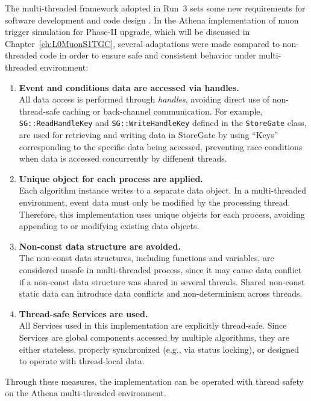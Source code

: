 The multi-threaded framework adopted in Run~3 sets some new requirements for software development and code design \cite{ATLAScomputing2025}. In the Athena implementation of muon trigger simulation for Phase-II upgrade, which will be discussed in Chapter~\ref{ch:L0MuonS1TGC}, several adaptations were made compared to non-threaded code in order to ensure safe and consistent behavior under multi-threaded environment:

\begin{enumerate}
  \item \textbf{Event and conditions data are accessed via handles.} \\
  All data access is performed through \textit{handles}, avoiding direct use of non-thread-safe caching or back-channel communication. For example, \texttt{SG::ReadHandleKey} and \texttt{SG::WriteHandleKey} defined in the \texttt{StoreGate} class, are used for retrieving and writing data in StoreGate by using ``Keys'' corresponding to the specific data being accessed, preventing race conditions when data is accessed concurrently by diffenent threads.
  
  \item \textbf{Unique object for each process are applied.} \\
  Each algorithm instance writes to a separate data object. In a multi-threaded environment, event data must only be modified by the processing thread. Therefore, this implementation uses unique objects for each process, avoiding appending to or modifying existing data objects.
  
  \item \textbf{Non-const data structure are avoided.} \\
  The non-const data structures, including functions and variables, are considered unsafe in multi-threaded process, since it may cause data conflict if a non-const data structure was shared in several threads. Shared non-const static data can introduce data conflicts and non-determinism across threads.
  
  \item \textbf{Thread-safe Services are used.} \\
  All Services used in this implementation are explicitly thread-safe. Since Services are global components accessed by multiple algorithms, they are either stateless, properly synchronized (e.g., via status locking), or designed to operate with thread-local data.
\end{enumerate}

Through these measures, the implementation can be operated with thread safety on the Athena multi-threaded environment.